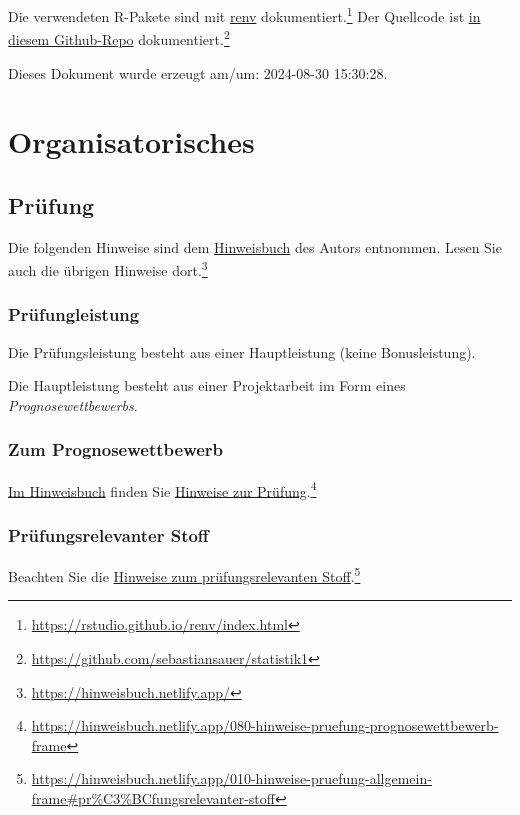 \documentclass[
  a4paper,
  DIV=11]{scrreprt}
\theoremstyle{definition}
\theoremstyle{definition}
\theoremstyle{definition}
\theoremstyle{remark}
\begin{document}
Die verwendeten R-Pakete sind mit
\href{https://rstudio.github.io/renv/index.html}{renv}
dokumentiert.\footnote{\url{https://rstudio.github.io/renv/index.html}}
Der Quellcode ist \href{https://github.com/sebastiansauer/statistik1}{in
diesem Github-Repo} dokumentiert.\footnote{\url{https://github.com/sebastiansauer/statistik1}}

Dieses Dokument wurde erzeugt am/um: 2024-08-30 15:30:28.

\part{Organisatorisches}

\chapter{Prüfung}\label{pruxfcfung}

Die folgenden Hinweise sind dem
\href{https://hinweisbuch.netlify.app/}{Hinweisbuch} des Autors
entnommen. Lesen Sie auch die übrigen Hinweise dort.\footnote{\url{https://hinweisbuch.netlify.app/}}

\section{Prüfungleistung}\label{pruxfcfungleistung}

Die Prüfungsleistung besteht aus einer Hauptleistung (keine
Bonusleistung).

Die Hauptleistung besteht aus einer Projektarbeit im Form eines
\emph{Prognosewettbewerbs}.

\section{Zum Prognosewettbewerb}\label{zum-prognosewettbewerb}

\href{https://hinweisbuch.netlify.app/}{Im Hinweisbuch} finden Sie
\href{https://hinweisbuch.netlify.app/080-hinweise-pruefung-prognosewettbewerb-frame}{Hinweise
zur Prüfung}.\footnote{\url{https://hinweisbuch.netlify.app/080-hinweise-pruefung-prognosewettbewerb-frame}}

\section{Prüfungsrelevanter Stoff}\label{pruxfcfungsrelevanter-stoff}

Beachten Sie die
\href{https://hinweisbuch.netlify.app/010-hinweise-pruefung-allgemein-frame\#pr\%C3\%BCfungsrelevanter-stoff}{Hinweise
zum prüfungsrelevanten Stoff}.\footnote{\url{https://hinweisbuch.netlify.app/010-hinweise-pruefung-allgemein-frame\#pr\%C3\%BCfungsrelevanter-stoff}}
\end{document}
